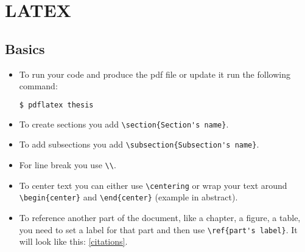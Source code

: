 \section{LATEX}

\subsection{Basics}
\begin{itemize}
\item To run your code and produce the pdf file or update it run the following command: \\
\begin{lstlisting}[language=bash]
  $ pdflatex thesis
\end{lstlisting}
\item To create sections you add \verb|\section{Section's name}|.
\item To add subsections you add \verb|\subsection{Subsection's name}|.
\item For line break you use \verb|\\|.
\item To center text you can either use \verb|\centering| or wrap your text around \verb|\begin{center}| and \verb|\end{center}| (example in abstract).
\item To reference another part of the document, like a chapter, a figure, a table, you need to set a label for that part and then use \verb|\ref{part's label}|. It will look like this: \ref{citations}.
\end{itemize}

